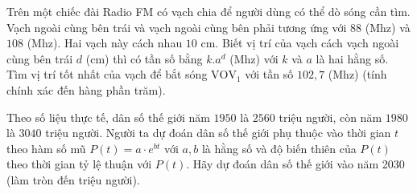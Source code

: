 \begin{bt}%

	Trên một chiếc đài Radio FM có vạch chia để người dùng có thể dò sóng cần tìm. Vạch ngoài cùng bên trái và vạch ngoài cùng bên phải tương ứng với $88$ (Mhz) và $108$ (Mhz). Hai vạch này cách nhau $10$ cm. Biết vị trí của vạch cách vạch ngoài cùng bên trái $d$ (cm) thì có tần số bằng $k.a^d$ (Mhz) với $k$ và $a$ là hai hằng số. Tìm vị trí tốt nhất của vạch để bắt sóng $\mathrm{VOV}_1$ với tần số $102,7$ (Mhz) (tính chính xác đến hàng phần trăm).
\end{bt}

\begin{bt}%

    Theo số liệu thực tế, dân số thế giới năm $1950$ là $2560$ triệu người, còn năm $1980$ là $3040$ triệu người. Người ta dự đoán dân số thế giới phụ thuộc vào thời gian $t$ theo hàm số mũ $P\left( t \right) = a\cdot{e^{bt}}$ với $a, b$  là hằng số và độ biến thiên của $P(t)$ theo thời gian tỷ lệ thuận với $P\left( t \right)$. Hãy dự đoán dân số thế giới vào năm 2030 (làm tròn đến triệu người).
\end{bt}

